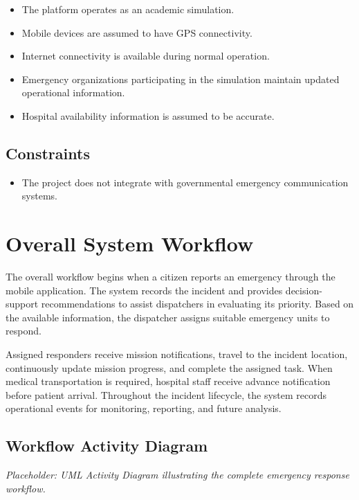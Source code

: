 \begin{itemize}
    \item The platform operates as an academic simulation.
    \item Mobile devices are assumed to have GPS connectivity.
    \item Internet connectivity is available during normal operation.
    \item Emergency organizations participating in the simulation maintain updated operational information.
    \item Hospital availability information is assumed to be accurate.
\end{itemize}

\subsection{Constraints}

\begin{itemize}
    \item The project does not integrate with governmental emergency communication systems.
\end{itemize}


\section{Overall System Workflow}

The overall workflow begins when a citizen reports an emergency through the mobile application. The system records the incident and provides decision-support recommendations to assist dispatchers in evaluating its priority. Based on the available information, the dispatcher assigns suitable emergency units to respond.

Assigned responders receive mission notifications, travel to the incident location, continuously update mission progress, and complete the assigned task. When medical transportation is required, hospital staff receive advance notification before patient arrival. Throughout the incident lifecycle, the system records operational events for monitoring, reporting, and future analysis.

\subsection{Workflow Activity Diagram}

\textit{Placeholder: UML Activity Diagram illustrating the complete emergency response workflow.}

